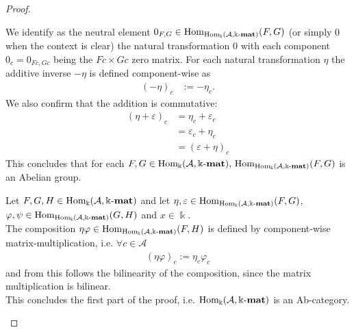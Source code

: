 \begin{proof}
\begin{enumerate}
\begin{subproof}[Proof of (i)]
We identify as the neutral element $0_{F,G} \in \mathrm{Hom}_{\mathrm{Hom_{\Bbbk}}(\mathcal{A},\Bbbk\textnormal{-}\mathbf{mat})}(F,G)$ (or simply $0$ when the context is clear)
the natural transformation $0$ with each component $0_{c} = 0_{Fc,Gc}$ being the $Fc\times Gc$ zero matrix.
For each natural transformation $\eta$ the additive inverse $-\eta$ is defined component-wise as
\begin{align}
(-\eta)_{c} &:= -\eta_{c}.
\end{align}
We also confirm that the addition is commutative:
\begin{align}
(\eta+\varepsilon)_{c} &= \eta_{c} + \varepsilon_{c}\\
    &= \varepsilon_{c} + \eta_{c}\\
    &= (\varepsilon + \eta)_{c}
\end{align}
This concludes that for each $F, G \in \mathrm{Hom_{\Bbbk}}(\mathcal{A},\Bbbk\textnormal{-}\mathbf{mat}),\, \mathrm{Hom}_{\mathrm{Hom_{\Bbbk}}(\mathcal{A},\Bbbk\textnormal{-}\mathbf{mat})}(F,G)$ is an Abelian group.
\end{subproof}
\begin{subproof}[Proof of (ii)]
Let $F, G, H \in \mathrm{Hom_{\Bbbk}}(\mathcal{A},\Bbbk\textnormal{-}\mathbf{mat})$ and let $\eta, \varepsilon \in \mathrm{Hom}_{\mathrm{Hom_{\Bbbk}}(\mathcal{A},\Bbbk\textnormal{-}\mathbf{mat})}(F,G)$,
$\varphi, \psi \in \mathrm{Hom}_{\mathrm{Hom_{\Bbbk}}(\mathcal{A},\Bbbk\textnormal{-}\mathbf{mat})}(G,H)$ and $x \in \Bbbk$.\\
The composition $\eta\varphi \in \mathrm{Hom}_{\mathrm{Hom_{\Bbbk}}(\mathcal{A},\Bbbk\textnormal{-}\mathbf{mat})}(F,H)$ is defined by component-wise matrix-multiplication,
i.e. $\forall c \in \mathcal{A}$
\begin{align*}
(\eta\varphi)_{c} := \eta_{c}\varphi_{c}
\end{align*}
and from this follows the bilinearity of the composition, since the matrix multiplication is bilinear.\\
This concludes the first part of the proof, i.e. $\mathrm{Hom_{\Bbbk}}(\mathcal{A},\Bbbk\textnormal{-}\mathbf{mat})$ is an Ab-category.
\end{subproof}


\end{enumerate}
\end{proof}
